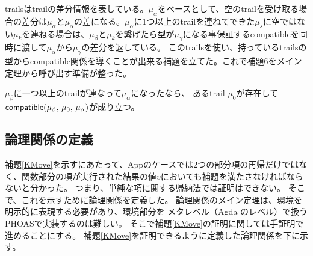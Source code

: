 trailsはtrailの差分情報を表している。$\mu_{\alpha}$をベースとして、空のtrailを受け取る場合の差分は$\mu_{\alpha}$と$\mu_{\alpha}$の差になる。$\mu_{\alpha}$に1つ以上のtrailを連ねてできた$\mu_s$に空ではない$\mu_k$を連ねる場合は、$\mu_{\beta}$と$\mu_k$を繋げたら型が$\mu_{\gamma}$になる事保証する\textsf{compatible}を同時に渡して$\mu_{\alpha}$から$\mu_{\gamma}$の差分を返している。
このtrailsを使い、持っているtrailsの型から\textsf{compatible}関係を導くことが出来る補題を立てた。これで補題6をメイン定理から呼び出す準備が整った。
\begin{lemma}\upshape
  $\mu_{\beta}$に一つ以上のtrailが連なって$\mu_{\alpha}$になったなら、
 あるtrail $\mu_0$が存在して
 $\textsf{compatible}(\mu_{\beta},\,\mu_0,\,\mu_{\alpha})$が成り立つ。
\end{lemma}


\subsection{論理関係の定義}
補題\ref{KMove}を示すにあたって、Appのケースでは2つの部分項の再帰だけではなく、関数部分の項が実行された結果の値$v$においても補題を満たさなければならないと分かった。
つまり、単純な項に関する帰納法では証明はできない。
そこで、これを示すために論理関係を定義した。
論理関係のメイン定理は、環境を明示的に表現する必要があり、環境部分を
メタレベル（Agda のレベル）で扱うPHOASで実装するのは難しい。
そこで補題\ref{KMove}の証明に関しては手証明で進めることにする。
補題\ref{KMove}を証明できるように定義した論理関係を下に示す。

